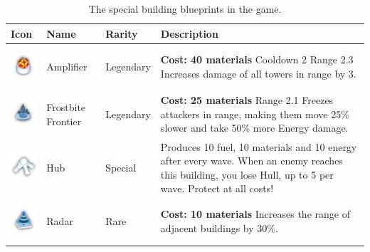 \begin{table}[H]
    \centering
    \begin{tabular}{m{15mm}m{20mm}lm{}}
        \toprule
        \textbf{Icon}                                                          & \textbf{Name}      & \textbf{Rarity} & \textbf{Description}                                               \\
        \midrule
        \includegraphics[height=15mm]{img/Icons/Buildings/Amplifier.png}       & Amplifier          & Legendary       &
        \footnotesize{\textbf{Cost: 40 materials} \newline Cooldown 2 \newline Range 2.3 \newline Increases damage of all towers in range by 3.}                                           \\

        \includegraphics[height=15mm]{img/Icons/Towers/Frostbite Frontier.png} & Frostbite Frontier & Legendary       &
        \footnotesize{\textbf{Cost: 25 materials} \newline Range 2.1 \newline Freezes attackers in range, making them move 25\% slower and take 50\% more Energy damage.}                  \\

        \includegraphics[height=15mm]{img/Icons/Buildings/Hub.png}             & Hub                & Special         &
        \footnotesize{Produces 10 fuel, 10 materials and 10 energy after every wave. \newline When an enemy reaches this building, you lose Hull, up to 5 per wave. Protect at all costs!} \\

        \includegraphics[height=15mm]{img/Icons/Buildings/Radar.png}           & Radar              & Rare            &
        \footnotesize{\textbf{Cost: 10 materials} \newline Increases the range of adjacent buildings by 30\%.}                                                                             \\
        \bottomrule
    \end{tabular}
    \caption{The special building blueprints in the game.}
    \label{tab:special-buildings}
\end{table}


